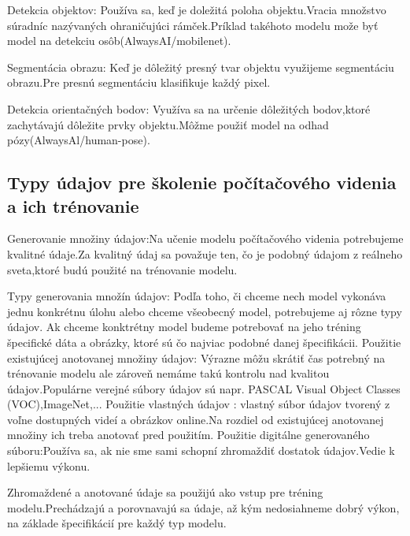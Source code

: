 \documentclass[10pt,twoside,slovak,a4paper]{coursepaper}
\begin{document}
Detekcia objektov: Používa sa, keď je doležitá poloha objektu.Vracia množstvo súradníc nazývaných ohraničujúci rámček.Príklad takéhoto modelu može byť model na detekciu osôb(AlwaysAI/mobilenet).

Segmentácia obrazu: Keď je dôležitý presný tvar objektu využijeme segmentáciu obrazu.Pre presnú segmentáciu klasifikuje každý pixel.

 Detekcia orientačných bodov: Využíva sa na určenie dôležitých bodov,ktoré zachytávajú dôležite prvky objektu.Môžme použiť model na odhad pózy(AlwaysAl/human-pose).
\cite{CV-framework}


\subsection{Typy údajov pre školenie počítačového videnia a ich trénovanie}
Generovanie množiny údajov:Na učenie modelu počítačového videnia potrebujeme kvalitné údaje.Za kvalitný údaj sa považuje ten, čo je podobný údajom z reálneho sveta,ktoré budú použité na trénovanie modelu.


Typy generovania množín údajov: Podľa toho, či chceme nech model vykonáva jednu konkrétnu úlohu alebo chceme všeobecný model, potrebujeme aj rôzne typy údajov.
Ak chceme konktrétny model budeme potrebovať na jeho tréning špecifické dáta a obrázky, ktoré sú čo najviac podobné danej špecifikácii.
Použitie existujúcej anotovanej množiny údajov: Výrazne môžu skrátiť čas potrebný na trénovanie modelu ale zároveň nemáme takú kontrolu nad kvalitou údajov.Populárne verejné súbory údajov sú napr. PASCAL Visual Object Classes (VOC),ImageNet,...
Použitie vlastných údajov : vlastný súbor údajov tvorený z voľne dostupných videí a obrázkov online.Na rozdiel od existujúcej anotovanej množiny ich treba anotovať pred použitím. Použitie digitálne generovaného súboru:Používa sa, ak nie sme sami schopní zhromaždiť dostatok údajov.Vedie k lepšiemu výkonu.
\cite{CV-framework}

Zhromaždené a anotované údaje sa použijú ako vstup pre tréning modelu.Prechádzajú a porovnavajú sa údaje, až kým nedosiahneme dobrý výkon, na základe špecifikácií pre každý typ modelu.
\end{document}
